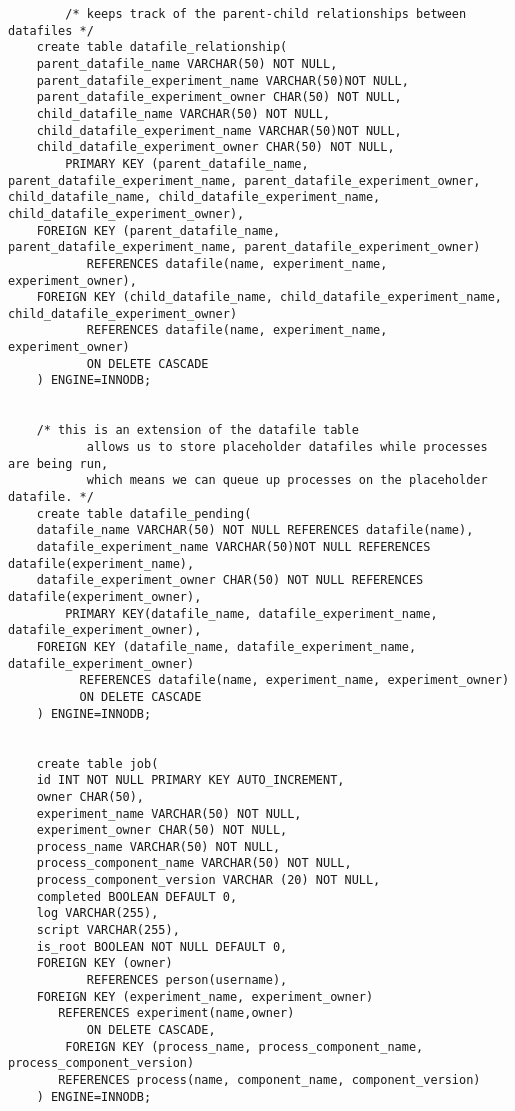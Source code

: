 \begin{tiny}
\begin{verbatim}
        /* keeps track of the parent-child relationships between datafiles */
 	create table datafile_relationship(
 	parent_datafile_name VARCHAR(50) NOT NULL,
 	parent_datafile_experiment_name VARCHAR(50)NOT NULL,
 	parent_datafile_experiment_owner CHAR(50) NOT NULL,
 	child_datafile_name VARCHAR(50) NOT NULL,
 	child_datafile_experiment_name VARCHAR(50)NOT NULL,
 	child_datafile_experiment_owner CHAR(50) NOT NULL,
        PRIMARY KEY (parent_datafile_name, parent_datafile_experiment_name, parent_datafile_experiment_owner, child_datafile_name, child_datafile_experiment_name, child_datafile_experiment_owner),
	FOREIGN KEY (parent_datafile_name, parent_datafile_experiment_name, parent_datafile_experiment_owner)
           REFERENCES datafile(name, experiment_name, experiment_owner),
	FOREIGN KEY (child_datafile_name, child_datafile_experiment_name, child_datafile_experiment_owner)
           REFERENCES datafile(name, experiment_name, experiment_owner)
           ON DELETE CASCADE
 	) ENGINE=INNODB;


 	/* this is an extension of the datafile table
           allows us to store placeholder datafiles while processes are being run,
           which means we can queue up processes on the placeholder datafile. */
 	create table datafile_pending(
 	datafile_name VARCHAR(50) NOT NULL REFERENCES datafile(name),
 	datafile_experiment_name VARCHAR(50)NOT NULL REFERENCES datafile(experiment_name),
 	datafile_experiment_owner CHAR(50) NOT NULL REFERENCES datafile(experiment_owner),
        PRIMARY KEY(datafile_name, datafile_experiment_name, datafile_experiment_owner),
	FOREIGN KEY (datafile_name, datafile_experiment_name, datafile_experiment_owner)
          REFERENCES datafile(name, experiment_name, experiment_owner)
          ON DELETE CASCADE
 	) ENGINE=INNODB;


	create table job(
	id INT NOT NULL PRIMARY KEY AUTO_INCREMENT,
	owner CHAR(50),
	experiment_name VARCHAR(50) NOT NULL,
	experiment_owner CHAR(50) NOT NULL,
	process_name VARCHAR(50) NOT NULL,
	process_component_name VARCHAR(50) NOT NULL,
	process_component_version VARCHAR (20) NOT NULL,
	completed BOOLEAN DEFAULT 0,
	log VARCHAR(255),
	script VARCHAR(255),
	is_root BOOLEAN NOT NULL DEFAULT 0,
	FOREIGN KEY (owner)
           REFERENCES person(username),
	FOREIGN KEY (experiment_name, experiment_owner) 
	   REFERENCES experiment(name,owner)
           ON DELETE CASCADE,
        FOREIGN KEY (process_name, process_component_name, process_component_version) 
	   REFERENCES process(name, component_name, component_version)
	) ENGINE=INNODB;


\end{verbatim}
\end{tiny}

